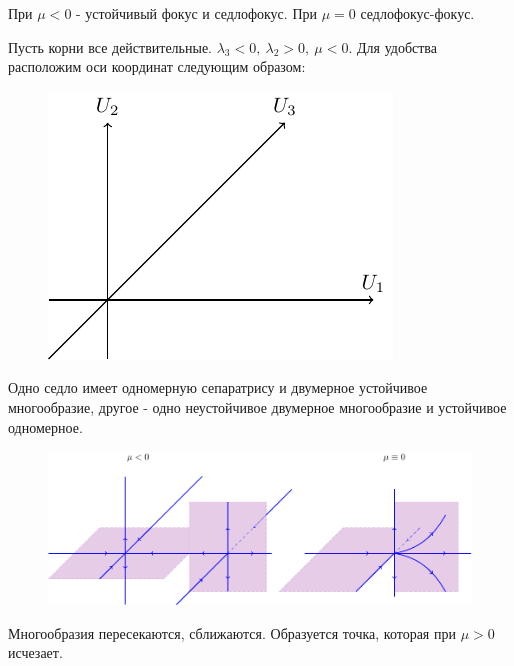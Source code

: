 При $\mu<0$ - устойчивый фокус и седлофокус. При $\mu=0$ седлофокус-фокус.

Пусть корни все действительные. $\lambda_3<0,~\lambda_2>0,~\mu<0$. Для удобства расположим оси координат следующим образом:
\begin{figure} 
	\vspace{0.1em}
	\centering
	\includegraphics[scale=1]{fig/fig51.pdf}
	\vspace{-0.25em}
\end{figure}

Одно седло имеет одномерную сепаратрису и двумерное устойчивое многообразие, другое - одно неустойчивое двумерное многообразие и устойчивое одномерное.

\begin{figure}[H]
	\centering
	\includegraphics[width=1\linewidth]{fig/fig52.pdf}   
\end{figure}

Многообразия пересекаются, сближаются. Образуется точка, которая при $\mu>0$ исчезает.




{}